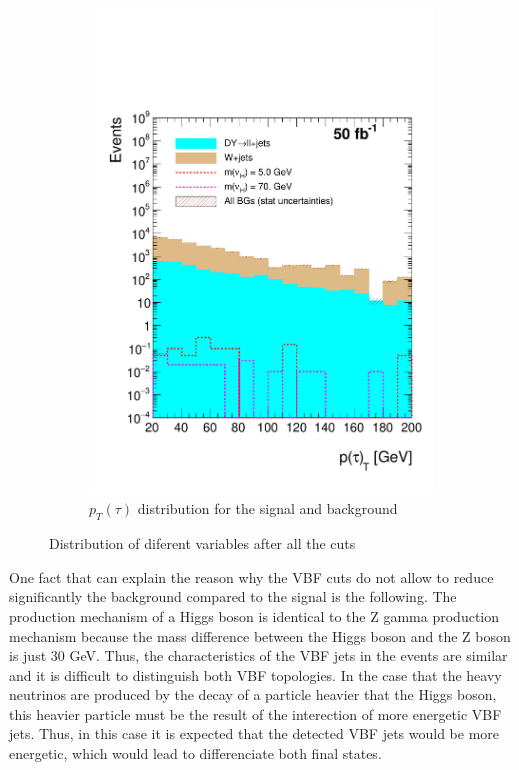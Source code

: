 \begin{figure}[h]
\begin{subfigure}{.5\textwidth}
  \includegraphics[width=1.1\linewidth]{./Capitulos/Analysis/AfterVBFCUTS/TauPt_MET20}
  \caption{$p_T(\tau)$ distribution for the signal and background}
  \label{taupt_VBF}
\end{subfigure}
\caption{Distribution of diferent variables after all the cuts}
\label{Variables_bjets}
\end{figure}
 
One fact that can explain the reason why the VBF cuts do not allow to reduce significantly the background compared to the signal is the following. The production mechanism of a Higgs boson is 
identical to the Z gamma production mechanism because the mass difference between the Higgs boson and the Z boson is just 30 GeV. Thus, the characteristics of the VBF jets in the events are similar
and it is difficult to distinguish both VBF topologies. In the case that the heavy neutrinos are produced by the decay of a particle heavier that the Higgs boson, this heavier particle must be the
result of the interection of more energetic VBF jets. Thus, in this case it is expected that the detected VBF jets would be more energetic, which would lead to differenciate both final states.

